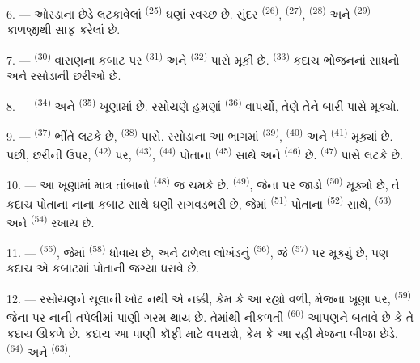 6. --- ઓરડાના છેડે લટકાવેલાં 
\textsuperscript{(25)} ઘણાં સ્વચ્છ છે. સુંદર 
\textsuperscript{(26)},  \textsuperscript{(27)},
 \textsuperscript{(28)} અને 
\textsuperscript{(29)} કાળજીથી સાફ કરેલાં છે.

7. ---  \textsuperscript{(30)} વાસણના કબાટ પર
 \textsuperscript{(31)} અને  \textsuperscript{(32)} પાસે મૂકી છે. 
\textsuperscript{(33)} કદાચ ભોજનનાં સાધનો અને રસોડાની છરીઓ છે.

8. ---  \textsuperscript{(34)} અને  \textsuperscript{(35)} ખૂણામાં છે. રસોયણે હમણાં  \textsuperscript{(36)} વાપર્યો, તેણે તેને બારી પાસે મૂક્યો.

9. ---  \textsuperscript{(37)} ભીંતે લટકે છે,
 \textsuperscript{(38)} પાસે. રસોડાના આ ભાગમાં
 \textsuperscript{(39)}, 
\textsuperscript{(40)} અને 
\textsuperscript{(41)} મૂક્યાં છે. પછી, છરીની ઉપર,
 \textsuperscript{(42)} પર, 
\textsuperscript{(43)},  \textsuperscript{(44)}
પોતાના  \textsuperscript{(45)} સાથે અને  \textsuperscript{(46)} છે.  \textsuperscript{(47)}
પાસે લટકે છે.

10. --- આ ખૂણામાં માત્ર તાંબાનો  \textsuperscript{(48)} જ
ચમકે છે.  \textsuperscript{(49)}, જેના પર
જાડો  \textsuperscript{(50)} મૂક્યો છે, તે કદાચ
પોતાના નાના કબાટ સાથે ઘણી સગવડભરી છે, જેમાં 
\textsuperscript{(51)} પોતાના  \textsuperscript{(52)} સાથે,
 \textsuperscript{(53)} અને 
\textsuperscript{(54)} રખાય છે.

\VUsaut{4.0mm}
\VUsaut{3.0mm}

11. ---  \textsuperscript{(55)}, જેમાં
 \textsuperscript{(58)} ધોવાય છે, અને ઢાળેલા લોખંડનું
 \textsuperscript{(56)}, જે 
\textsuperscript{(57)} પર મૂક્યું છે, પણ કદાચ એ કબાટમાં પોતાની જગ્યા
ધરાવે છે.

12. --- રસોયણને ચૂલાની ખોટ નથી એ નક્કી, કેમ કે આ રહ્યો વળી, મેજના
ખૂણા પર,  \textsuperscript{(59)} જેના પર નાની
તપેલીમાં પાણી ગરમ થાય છે. તેમાંથી નીકળતી 
\textsuperscript{(60)} આપણને બતાવે છે કે તે કદાચ ઊકળે છે. કદાચ આ પાણી
કૉફી માટે વપરાશે, કેમ કે આ રહી મેજના બીજા છેડે, 
\textsuperscript{(64)} અને  \textsuperscript{(63)}.


